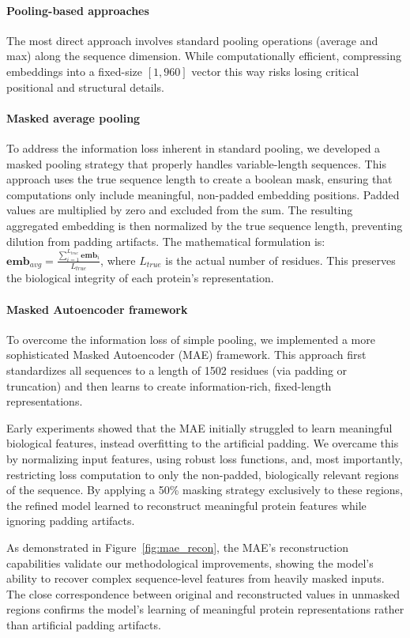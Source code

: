 \documentclass{article}
\begin{document}
	\paragraph{Pooling-based approaches} The most direct approach involves standard pooling operations (average and max) along the sequence dimension. While computationally efficient, compressing embeddings into a fixed-size $[1, 960]$ vector this way risks losing critical positional and structural details.

	\paragraph{Masked average pooling} To address the information loss inherent in standard pooling, we developed a masked pooling strategy that properly handles variable-length sequences. This approach uses the true sequence length to create a boolean mask, ensuring that computations only include meaningful, non-padded embedding positions. Padded values are multiplied by zero and excluded from the sum. The resulting aggregated embedding is then normalized by the true sequence length, preventing dilution from padding artifacts. The mathematical formulation is: $\mathbf{emb}_{avg} = \frac{\sum_{i=1}^{L_{true}} \mathbf{emb}_i}{L_{true}}$, where $L_{true}$ is the actual number of residues. This preserves the biological integrity of each protein's representation.

	\paragraph{Masked Autoencoder framework} To overcome the information loss of simple pooling, we implemented a more sophisticated Masked Autoencoder (MAE) framework. This approach first standardizes all sequences to a length of 1502 residues (via padding or truncation) and then learns to create information-rich, fixed-length representations.
	
	Early experiments showed that the MAE initially struggled to learn meaningful biological features, instead overfitting to the artificial padding. We overcame this by normalizing input features, using robust loss functions, and, most importantly, restricting loss computation to only the non-padded, biologically relevant regions of the sequence. By applying a 50\% masking strategy exclusively to these regions, the refined model learned to reconstruct meaningful protein features while ignoring padding artifacts.

	As demonstrated in Figure~\ref{fig:mae_recon}, the MAE's reconstruction capabilities validate our methodological improvements, showing the model's ability to recover complex sequence-level features from heavily masked inputs. The close correspondence between original and reconstructed values in unmasked regions confirms the model's learning of meaningful protein representations rather than artificial padding artifacts.
	
\end{document}
